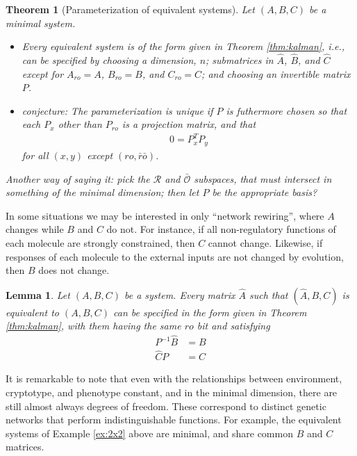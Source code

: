 \documentclass[11 pt]{article}
\newcommand{\plr}[1]{{\color{blue}\it #1}}
\newcommand{\ro}{{ro}}
\newcommand{\nrno}{{\bar{r}\bar{o}}}
\newcommand{\reachable}{\mathcal{R}}
\newcommand{\unobservable}{\bar{\mathcal{O}}}
\newtheorem{theorem}{Theorem}
\newtheorem{lemma}{Lemma}
\begin{document}
\begin{theorem}[Parameterization of equivalent systems]
    Let $(A,B,C)$ be a minimal system.
    \begin{itemize}
        \item[(a)]
            Every equivalent system is of the form given in Theorem \ref{thm:kalman},
            i.e., can be specified by choosing a dimension, $n$;
            submatrices in $\widehat A$, $\widehat B$, and $\widehat C$ 
            except for $A_\ro=A$, $B_\ro=B$, and $C_\ro=C$;
            and choosing an invertible matrix $P$.

        \item[(b)]
            \plr{conjecture:}
            The parameterization is unique
            if $P$ is futhermore chosen so that 
            each $P_x$ other than $P_\ro$ is a projection matrix,
            and that 
            \begin{align*}
                0
                =
                P_x^T P_y
            \end{align*}
            for all $(x,y)$ except $(\ro,\nrno)$.

    \end{itemize} 
\end{theorem}

\plr{Another way of saying it: pick the $\reachable$ and $\unobservable$ subspaces,
that must intersect in something of the minimal dimension;
then let $P$ be the appropriate basis?}

In some situations we may be interested in only ``network rewiring'',
where $A$ changes while $B$ and $C$ do not.
For instance, 
if all non-regulatory functions of each molecule are strongly constrained,
then $C$ cannot change.
Likewise, if responses of each molecule to the external inputs are not changed by evolution,
then $B$ does not change.

\begin{lemma}
    Let $(A,B,C)$ be a system.
    Every matrix $\widehat A$ such that $(\widehat A,B,C)$ is equivalent to $(A,B,C)$
    can be specified in the form given in Theorem \ref{thm:kalman},
    with \plr{them having the same $\ro$ bit}
    and satisfying
    \begin{align*}
        P^{-1} \widehat B &= B \\
        \widehat C P &= C
    \end{align*}
\end{lemma}

It is remarkable to note that even with the relationships 
between environment, cryptotype, and phenotype constant,
and in the minimal dimension,
there are still almost always degrees of freedom.
These correspond to distinct genetic networks
that perform indistinguishable functions.
For example, the equivalent systems of Example \ref{ex:2x2} above
are minimal, and share common $B$ and $C$ matrices.
\end{document}
